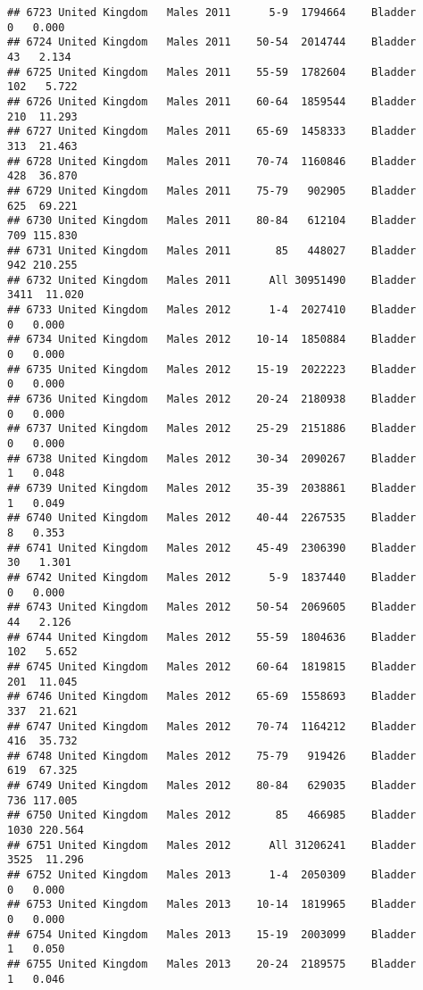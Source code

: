 \documentclass[
]{article}
\begin{document}
\begin{verbatim}
## 6723 United Kingdom   Males 2011      5-9  1794664    Bladder      0   0.000
## 6724 United Kingdom   Males 2011    50-54  2014744    Bladder     43   2.134
## 6725 United Kingdom   Males 2011    55-59  1782604    Bladder    102   5.722
## 6726 United Kingdom   Males 2011    60-64  1859544    Bladder    210  11.293
## 6727 United Kingdom   Males 2011    65-69  1458333    Bladder    313  21.463
## 6728 United Kingdom   Males 2011    70-74  1160846    Bladder    428  36.870
## 6729 United Kingdom   Males 2011    75-79   902905    Bladder    625  69.221
## 6730 United Kingdom   Males 2011    80-84   612104    Bladder    709 115.830
## 6731 United Kingdom   Males 2011       85   448027    Bladder    942 210.255
## 6732 United Kingdom   Males 2011      All 30951490    Bladder   3411  11.020
## 6733 United Kingdom   Males 2012      1-4  2027410    Bladder      0   0.000
## 6734 United Kingdom   Males 2012    10-14  1850884    Bladder      0   0.000
## 6735 United Kingdom   Males 2012    15-19  2022223    Bladder      0   0.000
## 6736 United Kingdom   Males 2012    20-24  2180938    Bladder      0   0.000
## 6737 United Kingdom   Males 2012    25-29  2151886    Bladder      0   0.000
## 6738 United Kingdom   Males 2012    30-34  2090267    Bladder      1   0.048
## 6739 United Kingdom   Males 2012    35-39  2038861    Bladder      1   0.049
## 6740 United Kingdom   Males 2012    40-44  2267535    Bladder      8   0.353
## 6741 United Kingdom   Males 2012    45-49  2306390    Bladder     30   1.301
## 6742 United Kingdom   Males 2012      5-9  1837440    Bladder      0   0.000
## 6743 United Kingdom   Males 2012    50-54  2069605    Bladder     44   2.126
## 6744 United Kingdom   Males 2012    55-59  1804636    Bladder    102   5.652
## 6745 United Kingdom   Males 2012    60-64  1819815    Bladder    201  11.045
## 6746 United Kingdom   Males 2012    65-69  1558693    Bladder    337  21.621
## 6747 United Kingdom   Males 2012    70-74  1164212    Bladder    416  35.732
## 6748 United Kingdom   Males 2012    75-79   919426    Bladder    619  67.325
## 6749 United Kingdom   Males 2012    80-84   629035    Bladder    736 117.005
## 6750 United Kingdom   Males 2012       85   466985    Bladder   1030 220.564
## 6751 United Kingdom   Males 2012      All 31206241    Bladder   3525  11.296
## 6752 United Kingdom   Males 2013      1-4  2050309    Bladder      0   0.000
## 6753 United Kingdom   Males 2013    10-14  1819965    Bladder      0   0.000
## 6754 United Kingdom   Males 2013    15-19  2003099    Bladder      1   0.050
## 6755 United Kingdom   Males 2013    20-24  2189575    Bladder      1   0.046

\end{verbatim}
\end{document}
